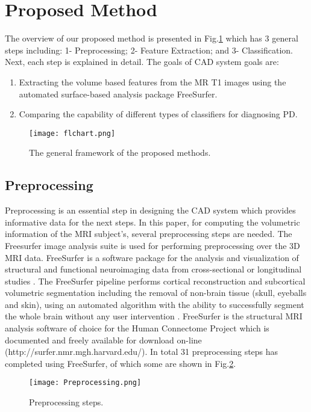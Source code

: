 \documentclass[runningheads,a4paper]{llncs}
\begin{document}
\section{Proposed Method}
The overview of our proposed method is presented in Fig.\ref{fig:framework}  which has $3$ general steps including: 1- Preprocessing; 2- Feature Extraction; and 3- Classification. Next, each step is explained in detail. The goals of CAD system goals are:
\begin{enumerate}
\item Extracting the volume based features from the MR T1 images using the automated surface-based analysis package FreeSurfer.
\item Comparing the capability of different types of classifiers for diagnosing PD.
\end{enumerate}

\begin{figure}[h!]
\texttt{[image: flchart.png]}
\caption{The general framework of the proposed methods.}
\label{fig:framework}
\end{figure}
\subsection{Preprocessing}
Preprocessing is an essential step in designing the CAD system which provides informative data for the next steps. In this paper, for computing the volumetric information of the MRI subject’s, several preprocessing steps are needed. The Freesurfer image analysis suite is used for performing preprocessing over the 3D MRI data. FreeSurfer is a software package for the analysis and visualization of structural and functional neuroimaging data from cross-sectional or longitudinal studies \cite{16}. The FreeSurfer pipeline performs cortical reconstruction and subcortical volumetric segmentation including the removal of non-brain tissue (skull, eyeballs and skin), using an automated algorithm with the ability to successfully segment the whole brain without any user intervention \cite{f}. FreeSurfer is the structural MRI analysis software of choice for the Human Connectome Project which is documented and freely available for download on-line (http://surfer.nmr.mgh.harvard.edu/). In total 31 preprocessing steps has completed using FreeSurfer, of which some are shown in Fig.\ref{fig:prepsteps}.
\begin{figure}
\centering
\texttt{[image: Preprocessing.png]}
\caption{Preprocessing steps.}
\label{fig:prepsteps}
\end{figure}
\end{document}
